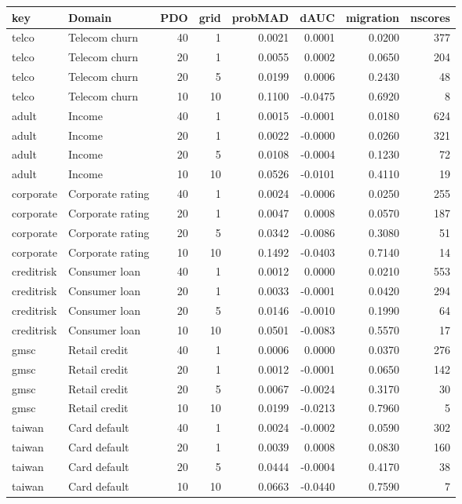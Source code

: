 \begin{tabular}{llrrrrrr}
\toprule
key & Domain & PDO & grid & probMAD & dAUC & migration & nscores \\
\midrule
telco & Telecom churn & 40 & 1 & 0.0021 & 0.0001 & 0.0200 & 377 \\
telco & Telecom churn & 20 & 1 & 0.0055 & 0.0002 & 0.0650 & 204 \\
telco & Telecom churn & 20 & 5 & 0.0199 & 0.0006 & 0.2430 & 48 \\
telco & Telecom churn & 10 & 10 & 0.1100 & -0.0475 & 0.6920 & 8 \\
adult & Income & 40 & 1 & 0.0015 & -0.0001 & 0.0180 & 624 \\
adult & Income & 20 & 1 & 0.0022 & -0.0000 & 0.0260 & 321 \\
adult & Income & 20 & 5 & 0.0108 & -0.0004 & 0.1230 & 72 \\
adult & Income & 10 & 10 & 0.0526 & -0.0101 & 0.4110 & 19 \\
corporate & Corporate rating & 40 & 1 & 0.0024 & -0.0006 & 0.0250 & 255 \\
corporate & Corporate rating & 20 & 1 & 0.0047 & 0.0008 & 0.0570 & 187 \\
corporate & Corporate rating & 20 & 5 & 0.0342 & -0.0086 & 0.3080 & 51 \\
corporate & Corporate rating & 10 & 10 & 0.1492 & -0.0403 & 0.7140 & 14 \\
creditrisk & Consumer loan & 40 & 1 & 0.0012 & 0.0000 & 0.0210 & 553 \\
creditrisk & Consumer loan & 20 & 1 & 0.0033 & -0.0001 & 0.0420 & 294 \\
creditrisk & Consumer loan & 20 & 5 & 0.0146 & -0.0010 & 0.1990 & 64 \\
creditrisk & Consumer loan & 10 & 10 & 0.0501 & -0.0083 & 0.5570 & 17 \\
gmsc & Retail credit & 40 & 1 & 0.0006 & 0.0000 & 0.0370 & 276 \\
gmsc & Retail credit & 20 & 1 & 0.0012 & -0.0001 & 0.0650 & 142 \\
gmsc & Retail credit & 20 & 5 & 0.0067 & -0.0024 & 0.3170 & 30 \\
gmsc & Retail credit & 10 & 10 & 0.0199 & -0.0213 & 0.7960 & 5 \\
taiwan & Card default & 40 & 1 & 0.0024 & -0.0002 & 0.0590 & 302 \\
taiwan & Card default & 20 & 1 & 0.0039 & 0.0008 & 0.0830 & 160 \\
taiwan & Card default & 20 & 5 & 0.0444 & -0.0004 & 0.4170 & 38 \\
taiwan & Card default & 10 & 10 & 0.0663 & -0.0440 & 0.7590 & 7 \\
\bottomrule
\end{tabular}
